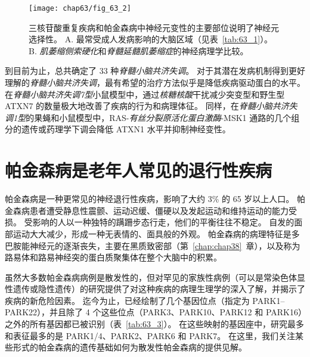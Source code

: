 \begin{figure}[htbp]
	\centering
	\texttt{[image: chap63/fig\_63\_2]}
	\caption{三核苷酸重复疾病和帕金森病中神经元变性的主要部位说明了神经元选择性。
		A. 最常受成人发病影响的大脑区域（见表~\ref{tab:63_1}）。
		B. \textit{肌萎缩侧索硬化}和\textit{脊髓延髓肌萎缩症}的神经病理学比较。}
	\label{fig:63_2}
\end{figure}


到目前为止，总共确定了 33 种\textit{脊髓小脑共济失调}。
对于其潜在发病机制得到更好理解的\textit{脊髓小脑共济失调}，最有希望的治疗方法似乎是降低疾病驱动蛋白的水平。
在\textit{脊髓小脑共济失调7型}小鼠模型中，通过\textit{核糖核酸}干扰减少突变型和野生型 ATXN7 的数量极大地改善了疾病的行为和病理体征。
同样，在\textit{脊髓小脑共济失调1型}的果蝇和小鼠模型中，RAS-\textit{有丝分裂原活化蛋白激酶}-MSK1 通路的几个组分的遗传或药理学下调会降低 ATXN1 水平并抑制神经变性。



\section{帕金森病是老年人常见的退行性疾病}

帕金森病是一种更常见的神经退行性疾病，影响了大约 3\% 的 65 岁以上人口。
帕金森病患者遭受静息性震颤、运动迟缓、僵硬以及发起运动和维持运动的能力受损。
受影响的人以一种独特的蹒跚步态行走，他们的平衡往往不稳定。
自发的面部运动大大减少，形成一种无表情的、面具般的外观。
帕金森病的病理特征是多巴胺能神经元的逐渐丧失，主要在黑质致密部（第~\ref{chap:chap38}~章），以及称为路易体和路易神经突的蛋白质聚集体在整个大脑中的积累。


虽然大多数帕金森病病例是散发性的，但对罕见的家族性病例（可以是常染色体显性遗传或隐性遗传）的研究提供了对这种疾病的病理生理学的深入了解，并揭示了疾病的新危险因素。
迄今为止，已经绘制了几个基因位点（指定为 PARK1–PARK22），并且除了 4 个这些位点（PARK3、PARK10、PARK12 和 PARK16）之外的所有基因都已被识别（表~\ref{tab:63_3}）。
在这些映射的基因座中，研究最多和表征最多的是 PARK1/4、PARK2、PARK6 和 PARK7。
在这里，我们关注某些形式的帕金森病的遗传基础如何为散发性帕金森病的提供见解。


